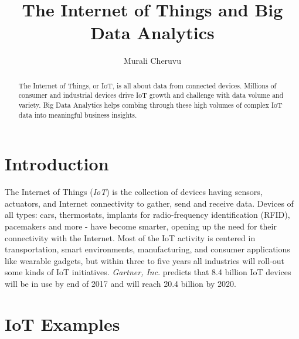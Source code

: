 \documentclass[sigconf]{acmart}
\begin{document}
	\title{The Internet of Things and Big Data Analytics}
	
	
	\author{Murali Cheruvu}
	
	\renewcommand{\shortauthors}{M. Cheruvu}
	
	
	\begin{abstract}
		
		The Internet of Things, or IoT, is all about data from connected devices. Millions of consumer and industrial devices drive IoT growth and challenge with data volume and variety. Big Data Analytics helps combing through these high volumes of complex IoT data into meaningful business insights.
		
	\end{abstract}
	
	
	\maketitle
	

	
	\section{Introduction}	
	
	The Internet of Things ({\em IoT}) is the collection of devices having sensors, actuators, and Internet connectivity to gather, send and receive data. Devices of all types: cars, thermostats, implants for radio-frequency identification (RFID), pacemakers and more - have become smarter, opening up the need for their connectivity with the Internet. Most of the IoT activity is centered in transportation, smart environments, manufacturing, and consumer applications like wearable gadgets, but within three to five years all industries will roll-out some kinds of IoT initiatives. {\em Gartner, Inc}. predicts that 8.4 billion IoT devices will be in use by end of 2017 and will reach 20.4 billion by 2020\cite{gartner}. 
	
	\section{IoT Examples}
	
\end{document}
